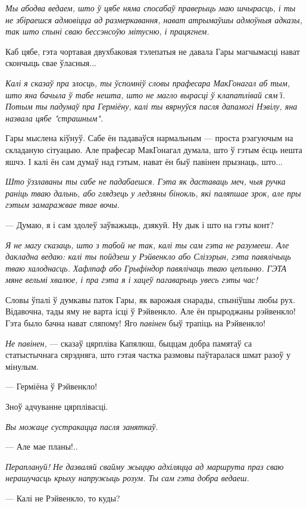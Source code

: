 \emph{Мы абодва ведаем, што ў цябе няма спосабаў праверыць маю шчырасць, 
і ты не збіраешся адмовіцца ад размеркавання, нават атрымаўшы адмоўныя адказы, 
так што спыні сваю бессэнсоўю мітусню, і працягнем.}

Каб цябе, гэта чортавая двухбаковая тэлепатыя не давала Гары магчымасці нават 
скончыць свае ўласныя...

\emph{Калі я сказаў пра злосць, ты ўспомніў словы прафесара МакГонагал аб тым,
што яна бачыла ў табе нешта, што не магло вырасці ў клапатлівай сям'і. Потым ты 
падумаў пра Герміёну, калі ты вярнуўся пасля дапамогі Нэвілу, яна назвала 
цябе "страшным".}

Гары мыслена кіўнуў. Сабе ён падаваўся нармальным --- проста рэагуючым на складаную
сітуацыю. Але прафесар МакГонагал думала, што ў гэтым ёсць нешта яшчэ. І калі 
ён сам думаў над гэтым, нават ён быў павінен прызнаць, што...

\emph{Што ўззлаваны ты сабе не падабаешся. Гэта як даставаць меч, чыя ручка 
раніць тваю дальнь, або глядзець у ледзяны бінокль, які паляпшае 
зрок, але пры гэтым замаражвае твае вочы.}

--- Думаю, я і сам здолеў заўважыць, дзякуй. Ну дык і што на гэты конт?

\emph{Я не магу сказаць, што з табой не так, калі ты сам гэта не разумееш.
Але дакладна ведаю: калі ты пойдзеш у Рэйвенкло або Слізэрын, гэта павялічыць 
тваю халоднасць. Хафлпаф або Грыфіндор павялічаць тваю цеплыню. ГЭТА мяне 
вельмі хвалюе, і пра гэта я і хацеў пагаварыць увесь гэты час!}

Словы ўпалі ў думкавы паток Гары, як варожыя снарады, спыніўшы любы рух.
Відавочна, тады яму не варта ісці ў Рэйвенкло. Але ён прыроджаны рэйвенкло!
Гэта было бачна нават сляпому! Яго \emph{павінен} быў трапіць на Рэйвенкло! 

\emph{Не павінен,} --- сказаў цярпліва Капялюш, быццам добра памятаў са
статыстычнага сярэдняга, што гэтая частка размовы паўтаралася шмат 
разоў у мінулым. 

--- Герміёна ў Рэйвенкло!

Зноў адчуванне цярплівасці. 

\emph{Вы можаце сустракацца пасля заняткаў.}

--- Але мае планы!..

\emph{Пераплануй! Не дазваляй свайму жыццю адхіляцца ад маршрута праз сваю нерашучасць 
крыху напружыць розум. Ты сам гэта добра ведаеш.}

--- Калі не Рэйвенкло, то куды?

